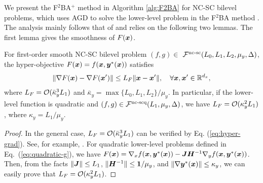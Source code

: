 \documentclass{article}
\begin{document}

We present the F${}^2$BA${}^+$ method in Algorithm \ref{alg:F2BA} for NC-SC bilevel problems, which uses AGD to solve the lower-level problem in the F${}^2$BA method \citep{chen2023near}.
The analysis mainly follows that of \citep{chen2023near} and relies on the following two lemmas. The first lemma gives the smoothness of $F({\bm{x}})$.


\begin{lem} \label{lem:smooth-phi}
For first-order smooth NC-SC bilevel problem $(f,g) \in$ ${\mathcal{F}}^{\text{nc-sc}}(L_0,L_1,L_2,\mu_y,\Delta)$, the hyper-objective $F({\bm{x}}) = f({\bm{x}},{\bm{y}}^*({\bm{x}}))$ satisfies
\begin{align} \label{eq:hyper-smooth}
    \Vert \nabla F({\bm{x}}) - \nabla F({\bm{x}}') \Vert \le L_F \Vert {\bm{x}}-  {\bm{x}}' \Vert, \quad \forall {\bm{x}},{\bm{x}}' \in {\mathbb{R}}^{d_x},
\end{align}
where $L_F = {\mathcal{O}}( \bar \kappa_y^3 L_1 )$ and $\bar \kappa_y = \max\{L_0,L_1,L_2 \} / \mu_y$. In particular, if the lower-level function is quadratic and $(f,g) \in {\mathcal{F}}^{\text{nc-scq}}(L_1,\mu_y, \Delta)$, we have $L_F = {\mathcal{O}}(\kappa_y^2 L_1)$, where $\kappa_y = L_1/ \mu_y$.
\end{lem}

\begin{proof}
In the general case, $L_F = {\mathcal{O}}( \bar \kappa_y^3 L_1)$ can be verified by Eq. (\ref{eq:hyper-grad}). See, for example, {\citep[Lemma 2.2]{ghadimi2018approximation}}. For quadratic lower-level problems defined in Eq.~(\ref{eq:quadratic-g}), we have $F({\bm{x}}) = \nabla_x f({\bm{x}},{\bm{y}}^*({\bm{x}})) - {\bm{J}} {\bm{H}}^{-1} \nabla_y f({\bm{x}},{\bm{y}}^*({\bm{x}}))$. Then, from the facts $\Vert {\bm{J}} \Vert \le L_1$, $\Vert {\bm{H}}^{-1} \Vert \le \bm{1}/\mu_y$, and $\Vert \nabla {\bm{y}}^*({\bm{x}}) \Vert \le \kappa_y$, we can easily prove that $L_F = {\mathcal{O}}(\kappa_y^2 L_1)$.
\end{proof}
\end{document}
